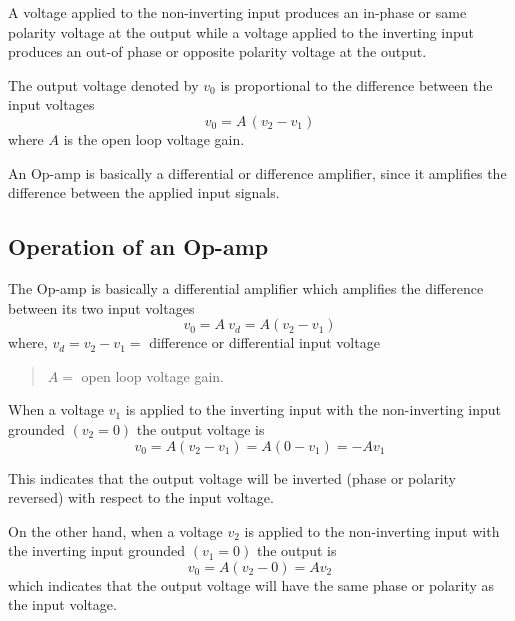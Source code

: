 A voltage applied to the non-inverting input produces an in-phase or same polarity voltage at the output while a voltage applied to the inverting input produces an out-of phase or opposite polarity voltage at the output.

The output voltage denoted by $v_{0}$ is proportional to the difference between the input voltages
\begin{equation}
v_{0}=A\,(v_{2}-v_{1})\label{eq5.1}
\end{equation}
where $A$ is the open loop voltage gain.

An Op-amp is basically a differential or difference amplifier, since it amplifies the difference between the applied input signals.

\subsection{Operation of an Op-amp}\label{sec5.1.2}

The Op-amp is basically a differential amplifier which amplifies the difference between its two input voltages
\begin{equation}
v_{0}=A \ v_{d}=A(v_{2}-v_{1})\label{eq5.2}
\end{equation}
where, $v_{d}=v_{2}-v_{1}=$ difference or differential input voltage
\begin{quote}
$A=$ open loop voltage gain.
\end{quote}

When a voltage $v_{1}$ is applied to the inverting input with the non-inverting input grounded $(v_{2}=0)$ the output voltage is
\begin{equation}
v_{0}=A(v_{2}-v_{1})=A(0-v_{1})=-Av_{1}\label{eq5.3}
\end{equation}

This indicates that the output voltage will be inverted (phase or polarity reversed) with respect to the input voltage.

On the other hand, when a voltage $v_{2}$ is applied to the non-inverting input with the inverting input grounded $(v_{1}=0)$ the output is
\begin{equation}
v_{0}=A(v_{2}-0)=Av_{2}\label{eq5.4}
\end{equation}
which indicates that the output voltage will have the same phase or polarity as the input voltage.

